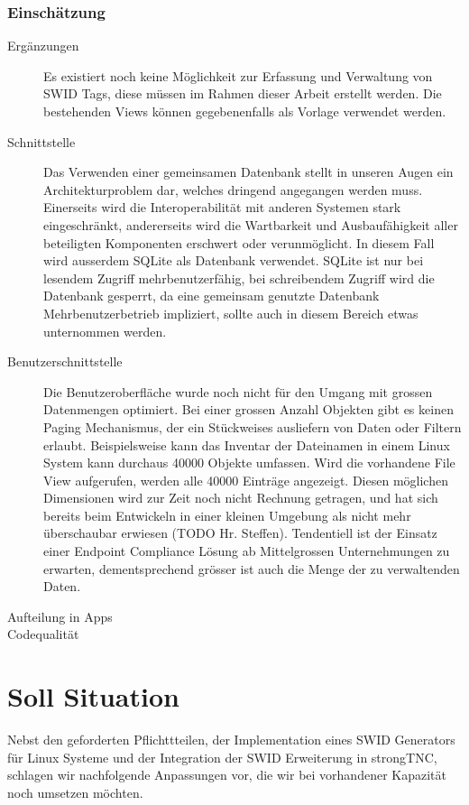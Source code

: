 \subsubsection{Einschätzung}
\begin{description}
	\item[Ergänzungen] Es existiert noch keine Möglichkeit zur Erfassung und
	Verwaltung von SWID Tags, diese müssen im Rahmen dieser Arbeit erstellt werden.
	Die bestehenden Views können gegebenenfalls als Vorlage verwendet werden.
	
	\item[Schnittstelle] Das Verwenden einer gemeinsamen Datenbank stellt in unseren
	Augen ein Architekturproblem dar, welches dringend angegangen werden muss.
	Einerseits wird die Interoperabilität mit anderen Systemen stark eingeschränkt,
	andererseits wird die Wartbarkeit und Ausbaufähigkeit aller beteiligten
	Komponenten erschwert oder verunmöglicht. In diesem Fall wird ausserdem SQLite
	als Datenbank verwendet. SQLite ist nur bei lesendem Zugriff mehrbenutzerfähig,
	bei schreibendem Zugriff wird die Datenbank gesperrt, da eine gemeinsam
	genutzte Datenbank Mehrbenutzerbetrieb impliziert, sollte auch in diesem Bereich
	etwas unternommen werden. 
	
	\item[Benutzerschnittstelle] 
	Die Benutzeroberfläche wurde noch nicht für den Umgang mit grossen Datenmengen
	optimiert. Bei einer grossen Anzahl Objekten gibt es keinen Paging Mechanismus,
	der ein Stückweises ausliefern von Daten oder Filtern erlaubt. Beispielsweise
	kann das Inventar der Dateinamen in einem Linux System kann durchaus 40000
	Objekte umfassen. Wird die vorhandene File View aufgerufen, werden alle 40000
	Einträge angezeigt. Diesen möglichen Dimensionen wird zur Zeit noch nicht
	Rechnung getragen, und hat sich bereits beim Entwickeln in einer kleinen
	Umgebung als nicht mehr überschaubar erwiesen (TODO Hr. Steffen). Tendentiell
	ist der Einsatz einer Endpoint Compliance Lösung ab Mittelgrossen
	Unternehmungen zu erwarten, dementsprechend grösser ist auch die Menge der
	zu verwaltenden Daten.

\item[Aufteilung in Apps] 
	
	\item[Codequalität]
	
	
\end{description}

\section{Soll Situation} Nebst den geforderten Pflichttteilen, der
	Implementation eines SWID Generators für Linux Systeme und der Integration der
	SWID Erweiterung in strongTNC, schlagen wir nachfolgende Anpassungen vor, die
	wir bei vorhandener Kapazität noch umsetzen möchten.

